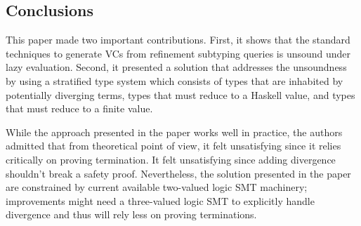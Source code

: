 \documentclass[a4paper,UKenglish]{lipics-v2016}
\begin{document}
\subsection{Conclusions}
This paper made two important contributions.  First, it shows that the standard
techniques to generate VCs from refinement subtyping queries is unsound under
lazy evaluation.  Second, it presented a solution that addresses the
unsoundness by using a stratified type system which consists of types that are
inhabited by potentially diverging terms, types that must reduce to a Haskell
value, and types that must reduce to a finite value.  

While the approach presented in the paper works well in practice, the authors
admitted that from theoretical point of view, it felt unsatisfying since it
relies critically on proving termination.  It felt unsatisfying since adding
divergence shouldn't break a safety proof.  Nevertheless, the solution
presented in the paper are constrained by current available two-valued logic SMT
machinery; improvements might need a three-valued logic SMT to explicitly
handle divergence and thus will rely less on proving terminations.




\cite{*}


\end{document}
